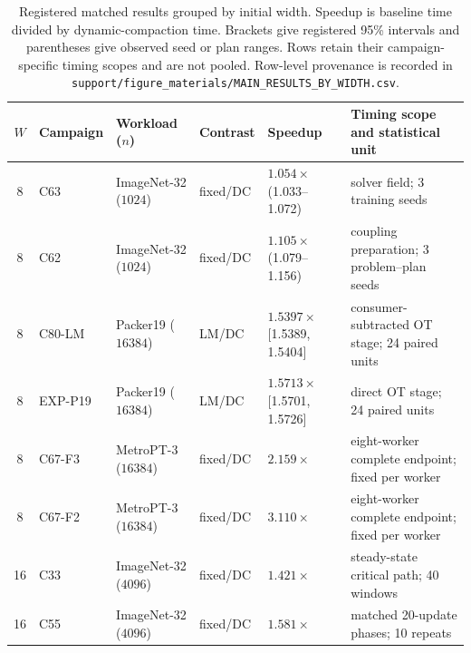 \begin{table}[!t]
\centering
\caption{Registered matched results grouped by initial width. Speedup is
baseline time divided by dynamic-compaction time. Brackets give registered
95\% intervals and parentheses give observed seed or plan ranges. Rows retain
their campaign-specific timing scopes and are not pooled. Row-level provenance
is recorded in \texttt{support/figure\_materials/MAIN\_RESULTS\_BY\_WIDTH.csv}.}
\label{tab:main-results-by-width}
\scriptsize
\setlength{\tabcolsep}{3.3pt}
\begin{tabular}{@{}cllllp{4.0cm}@{}}
\toprule
$W$ & Campaign & Workload ($n$) & Contrast & Speedup & Timing scope and statistical unit \\
\midrule
8 & C63 & ImageNet-32 ($1024$) & fixed/DC & $1.054\times$ (1.033--1.072) & solver field; 3 training seeds \\
8 & C62 & ImageNet-32 ($1024$) & fixed/DC & $1.105\times$ (1.079--1.156) & coupling preparation; 3 problem--plan seeds \\
8 & C80-LM & Packer19 ($16384$) & LM/DC & $1.5397\times$ [1.5389, 1.5404] & consumer-subtracted OT stage; 24 paired units \\
8 & EXP-P19 & Packer19 ($16384$) & LM/DC & $1.5713\times$ [1.5701, 1.5726] & direct OT stage; 24 paired units \\
8 & C67-F3 & MetroPT-3 ($16384$) & fixed/DC & $2.159\times$ & eight-worker complete endpoint; fixed per worker \\
8 & C67-F2 & MetroPT-3 ($16384$) & fixed/DC & $3.110\times$ & eight-worker complete endpoint; fixed per worker \\
\midrule
16 & C33 & ImageNet-32 ($4096$) & fixed/DC & $1.421\times$ & steady-state critical path; 40 windows \\
16 & C55 & ImageNet-32 ($4096$) & fixed/DC & $1.581\times$ & matched 20-update phases; 10 repeats \\

\end{tabular}
\end{table}
